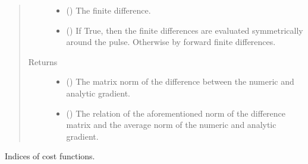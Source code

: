 \documentclass[letterpaper,10pt,english]{sphinxmanual}
\begin{document}
\begin{fulllineitems}
\begin{fulllineitems}
\begin{quote}
\begin{description}
\begin{itemize}
\item {} 
 () \textendash{} The finite difference.

\item {} 
 () \textendash{} If True, then the finite differences are evaluated symmetrically
around the pulse. Otherwise by forward finite differences.

\end{itemize}

\item[{Returns}] \leavevmode
\begin{itemize}
\item {} 
 () \textendash{} The matrix norm of the difference between the numeric and analytic
gradient.

\item {} 
 () \textendash{} The relation of the aforementioned norm of the difference matrix
and the average norm of the numeric and analytic gradient.

\end{itemize}


\end{description}\end{quote}

\end{fulllineitems}


\begin{fulllineitems}
\label{\detokenize{qsim:qsim.simulator.Simulator.cost_indices}}
Indices of cost functions.

\end{fulllineitems}



\end{fulllineitems}
\end{document}

